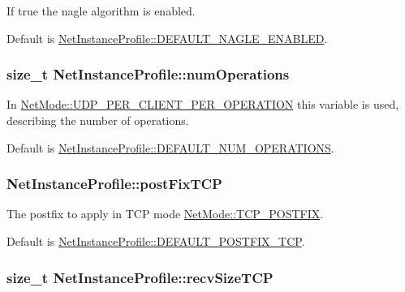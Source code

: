 If true the nagle algorithm is enabled. 

Default is \hyperlink{class_net_instance_profile_a0f709c306b12e5572df975b10d6c748f}{NetInstanceProfile::DEFAULT\_\-NAGLE\_\-ENABLED}. \hypertarget{class_net_instance_profile_acfc20340749f35543345f8b6c00fef4a}{
\subsubsection[{numOperations}]{\setlength{\rightskip}{0pt plus 5cm}size\_\-t {\bf NetInstanceProfile::numOperations}}}
\label{class_net_instance_profile_acfc20340749f35543345f8b6c00fef4a}


In \hyperlink{class_net_mode_a43cfa55ee6a4db66a8d7d6c27f766964a947fd0828716fc0442ea546cce111c27}{NetMode::UDP\_\-PER\_\-CLIENT\_\-PER\_\-OPERATION} this variable is used, describing the number of operations. 

Default is \hyperlink{class_net_instance_profile_a23a92f33275c72e9f999e80a9acfe8e3}{NetInstanceProfile::DEFAULT\_\-NUM\_\-OPERATIONS}. \hypertarget{class_net_instance_profile_a6d540756a8887426bdff2cd7fa82e349}{
\subsubsection[{postFixTCP}]{ {\bf NetInstanceProfile::postFixTCP}}}
\label{class_net_instance_profile_a6d540756a8887426bdff2cd7fa82e349}


The postfix to apply in TCP mode \hyperlink{class_net_mode_a43cfa55ee6a4db66a8d7d6c27f766964abe08876125a416186e74c901f6d29ce4}{NetMode::TCP\_\-POSTFIX}. 

Default is \hyperlink{class_net_instance_profile_a309f6b2f32bd9dcbb9bd5e15e7381de2}{NetInstanceProfile::DEFAULT\_\-POSTFIX\_\-TCP}. \hypertarget{class_net_instance_profile_a399872e7c3f23fbee9f2283d1ac8fc04}{
\subsubsection[{recvSizeTCP}]{\setlength{\rightskip}{0pt plus 5cm}size\_\-t {\bf NetInstanceProfile::recvSizeTCP}}}
\label{class_net_instance_profile_a399872e7c3f23fbee9f2283d1ac8fc04}


